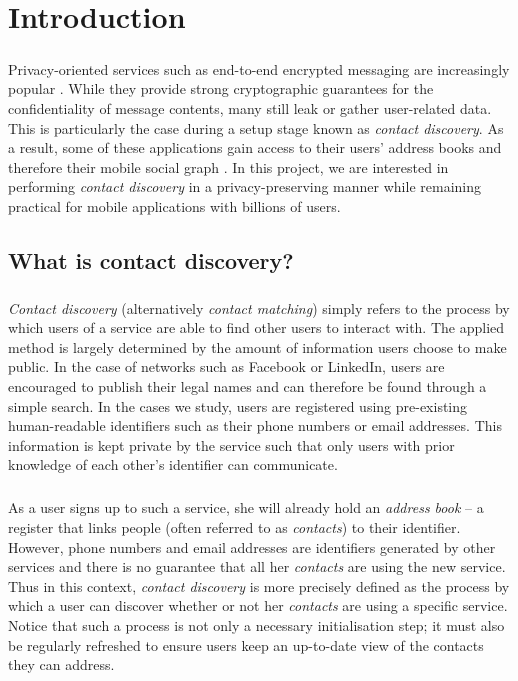 \chapter{Introduction}
\label{chap:intro}


\paragraph{} Privacy-oriented services such as end-to-end encrypted messaging are increasingly popular \cite{e2epopular}. While they provide strong cryptographic guarantees for the confidentiality of message contents, many still leak or gather user-related data. This is particularly the case during a setup stage known as \textit{contact discovery}. As a result, some of these applications gain access to their users' address books and therefore their mobile social graph \cite{Telegram,WhatsApp}. In this project, we are interested in performing \textit{contact discovery} in a privacy-preserving manner while remaining practical for mobile applications with billions of users.

\section{What is contact discovery?}

\paragraph{} \textit{Contact discovery} (alternatively \textit{contact matching}) simply refers to the process by which users of a service are able to find other users to interact with. The applied method is largely determined by the amount of information users choose to make public. In the case of networks such as Facebook or LinkedIn, users are encouraged to publish their legal names and can therefore be found through a simple search. In the cases we study, users are registered using pre-existing human-readable identifiers such as their phone numbers or email addresses. This information is kept private by the service such that only users with prior knowledge of each other's identifier can communicate.

\paragraph{} As a user signs up to such a service, she will already hold an \textit{address book} -- a register that links people (often referred to as \textit{contacts}) to their identifier. However, phone numbers and email addresses are identifiers generated by other services and there is no guarantee that all her \textit{contacts} are using the new service. Thus in this context, \textit{contact discovery} is more precisely defined as the process by which a user can discover whether or not her \textit{contacts} are using a specific service. Notice that such a process is not only a necessary initialisation step; it must also be regularly refreshed to ensure users keep an up-to-date view of the contacts they can address.


